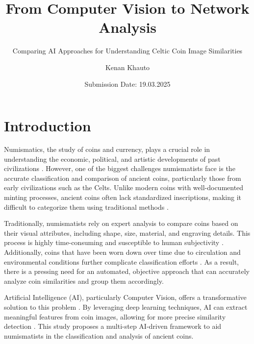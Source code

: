 \documentclass[nolibertine, english, algorithm, nomencl, minted]{ttlab-qualify}
\begin{document}
\titlehead{
  Kenan Khauto\\
  7592047\\
  B.Sc Informatik\\
  kenan.khauto@stud.uni-frankfurt.de 
}
\subject{Bachelor Thesis}
\author{Kenan Khauto}
\title{From Computer Vision to Network Analysis}
\subtitle{Comparing AI Approaches for Understanding Celtic Coin Image Similarities}
\date{Submission Date: 19.03.2025}
\publishers{Goethe-Universität Frankfurt am Main\\Dr. Karsten Tolle}

\maketitle



\tableofcontents

\chapter{Introduction}
Numismatics, the study of coins and currency, plays a crucial role in understanding the economic, political, and artistic developments 
of past civilizations \parencite{numismaticnews2023grading}. 
However, one of the biggest challenges numismatists face is the accurate classification and comparison of ancient coins, particularly 
those from early civilizations such as the Celts. Unlike modern coins with well-documented minting processes, ancient coins often lack 
standardized inscriptions, making it difficult to categorize them using traditional methods \parencite{oldcurrencyexchange2016grading}.

Traditionally, numismatists rely on expert analysis to compare coins based on their visual attributes, including shape, size, 
material, and engraving details. This process is highly time-consuming and susceptible to 
human subjectivity \parencite{numismaticnews2023biases}. Additionally, coins that have been worn down over time due to 
circulation and environmental conditions further complicate classification efforts \parencite{oldcurrencyexchange2016grading}. 
As a result, there is a pressing need for an automated, objective approach that can accurately analyze coin similarities and group 
them accordingly.

Artificial Intelligence (AI), particularly Computer Vision, offers a transformative solution to this problem \parencite{coinsweekly2023ai}. 
By leveraging deep learning techniques, AI can extract meaningful features from coin images, allowing for more precise 
similarity detection \parencite{hinh2023numi}. This study proposes a multi-step AI-driven framework to 
aid numismatists in the classification and 
analysis of ancient coins. 
\end{document}

